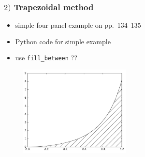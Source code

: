 \documentclass[english,14pt]{beamer}
\begin{document}
\begin{frame}[fragile]

\frametitle{$2)$ Trapezoidal method}

\begin{itemize}
	\item simple four-panel example on pp.~134--135
	\item Python code for simple example
	\item use \texttt{fill\_between} ??
\end{itemize}

\begin{figure}[ht]
	\centering
	\includegraphics[width=0.5\textwidth]{figures/LLp134}
\end{figure}

\end{frame}

%
%
%
%
%

\end{document}
